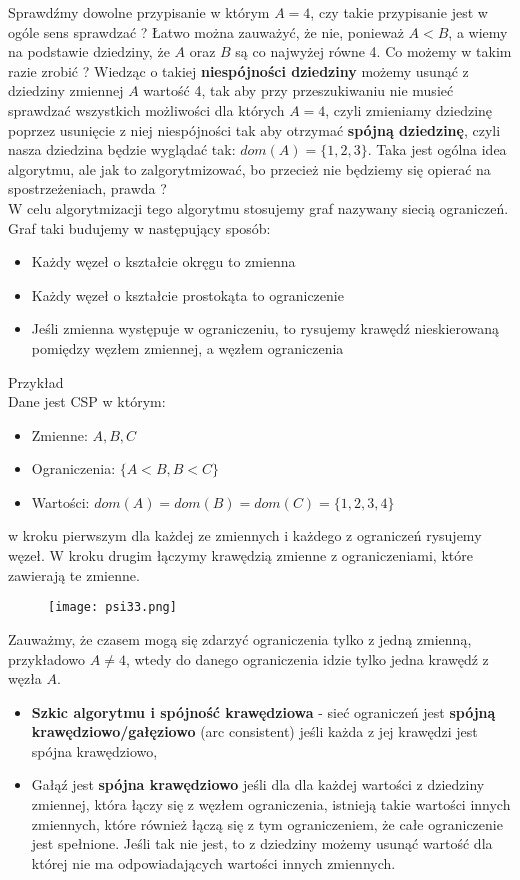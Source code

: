 \documentclass[a4paper,15pt]{article}
\begin{document}
Sprawdźmy dowolne przypisanie w którym $A=4$, czy takie przypisanie jest w ogóle sens sprawdzać ? Łatwo można zauważyć, że nie, ponieważ $A<B$, a wiemy na podstawie dziedziny, że $A$ oraz $B$ są co najwyżej równe 4. Co możemy w takim razie zrobić ? Wiedząc o takiej \textbf{niespójności dziedziny} możemy usunąć z dziedziny zmiennej $A$ wartość 4, tak aby przy przeszukiwaniu nie musieć sprawdzać wszystkich możliwości dla których $A=4$, czyli zmieniamy dziedzinę poprzez usunięcie z niej niespójności tak aby otrzymać \textbf{spójną dziedzinę}, czyli nasza dziedzina będzie wyglądać tak: $dom(A)=\{1,2,3\}$. Taka jest ogólna idea algorytmu, ale jak to zalgorytmizować, bo przecież nie będziemy się opierać na spostrzeżeniach, prawda ? \\

W celu algorytmizacji tego algorytmu stosujemy graf nazywany siecią ograniczeń. Graf taki budujemy w następujący sposób:

\begin{itemize}
\item Każdy węzeł o kształcie okręgu to zmienna
\item Każdy węzeł o kształcie prostokąta to ograniczenie
\item Jeśli zmienna występuje w ograniczeniu, to rysujemy krawędź nieskierowaną pomiędzy węzłem zmiennej, a węzłem ograniczenia
\end{itemize}

Przykład \\

Dane jest CSP w którym:
\begin{itemize}
\item Zmienne: $A,B,C$
\item Ograniczenia: $\{A<B, B<C\}$
\item Wartości: $dom(A)=dom(B)=dom(C)=\{1,2,3,4\}$
\end{itemize}
w kroku pierwszym dla każdej ze zmiennych i każdego z ograniczeń rysujemy węzeł. W kroku drugim łączymy krawędzią zmienne z ograniczeniami, które zawierają te zmienne.
\begin{figure}[H]
\centerline{\texttt{[image: psi33.png]}}
\end{figure}
Zauważmy, że czasem mogą się zdarzyć ograniczenia tylko z jedną zmienną, przykładowo $A\neq4$, wtedy do danego ograniczenia idzie tylko jedna krawędź z węzła $A$. \\

\begin{itemize}
\item \textbf{Szkic algorytmu i spójność krawędziowa} - sieć ograniczeń jest \textbf{spójną krawędziowo/gałęziowo} (arc consistent) jeśli każda z jej krawędzi jest spójna krawędziowo,
\item Gałąź jest \textbf{spójna krawędziowo} jeśli dla dla każdej wartości z dziedziny zmiennej, która łączy się z węzłem ograniczenia, istnieją takie wartości innych zmiennych, które również łączą się z tym ograniczeniem, że całe ograniczenie jest spełnione. Jeśli tak nie jest, to z dziedziny możemy usunąć wartość dla której nie ma odpowiadających wartości innych zmiennych.  
\end{itemize}
\end{document}
